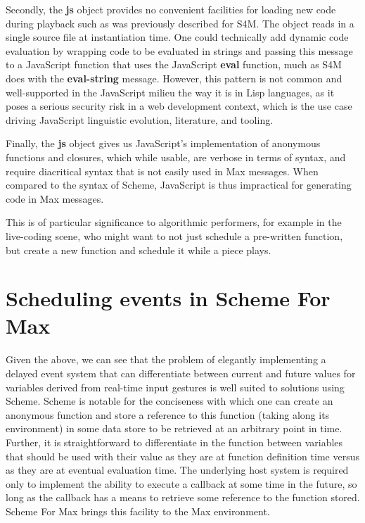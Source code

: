 \documentclass[acmsmall]{acmart}
\begin{document}
Secondly, the \textbf{js} object provides no convenient facilities for loading new code
during playback such as was previously described for S4M.
The object reads in a single source file at instantiation time.
One could technically add dynamic code evaluation by wrapping
code to be evaluated in strings and passing this message to a JavaScript function
that uses the JavaScript \textbf{eval} function, much as S4M does with the
\textbf{eval-string} message. However, this pattern is not common and well-supported
in the JavaScript milieu the way it is in Lisp languages, as it poses a serious security risk in a 
web development context, which is the use case driving JavaScript linguistic
evolution, literature, and tooling.

Finally, the \textbf{js} object gives us JavaScript's implementation of anonymous functions
and closures, which while usable, are verbose in terms of syntax, and require
diacritical syntax that is not easily used in Max messages. When compared to the syntax
of Scheme, JavaScript is thus impractical for generating code in Max messages.

This is of particular significance to algorithmic performers, 
for example in the live-coding scene, who might
want to not just schedule a pre-written function, but create a new function 
and schedule it while a piece plays.


\section{Scheduling events in Scheme For Max}

Given the above, we can see that the problem of elegantly implementing 
a delayed event system that can differentiate between current and future values
for variables derived from real-time input gestures is well suited to solutions 
using Scheme. Scheme is notable for the conciseness with which one can create an anonymous function
and store a reference to this function (taking along its environment) in some data
store to be retrieved at an arbitrary point in time. Further, it is straightforward
to differentiate in the function between variables that should
be used with their value as they are at function definition time versus
as they are at eventual evaluation time. The underlying host system is required only to 
implement the ability to execute a callback at some time in the future, so long as 
the callback has a means to retrieve some reference to the function stored.
Scheme For Max brings this facility to the Max environment.
\end{document}

